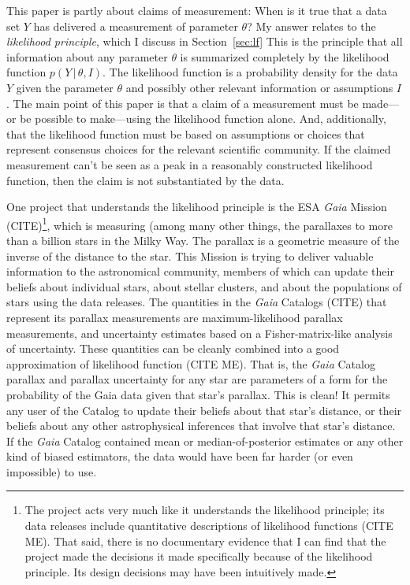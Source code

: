 \documentclass{article}
\newcommand{\sectionname}{Section}
\newcommand{\secref}[1]{\sectionname~\ref{#1}}
\newcommand{\given}{\,|\,}
\begin{document}
This paper is partly about claims of measurement:
When is it true that a data set $Y$ has delivered a measurement of parameter $\theta$?
My answer relates to the \emph{likelihood principle}, which I discuss in \secref{sec:lf}
This is the principle that all information about any parameter $\theta$ is summarized completely by the likelihood function $p(Y\given\theta, I)$.
The likelihood function is a probability density for the data $Y$ given the parameter $\theta$ and possibly other relevant information or assumptions $I$.
The main point of this paper is that a claim of a measurement must be made---or be possible to make---using the likelihood function alone.
And, additionally, that the likelihood function must be based on assumptions or choices that represent consensus choices for the relevant scientific community.
If the claimed measurement can't be seen as a peak in a reasonably constructed likelihood function, then the claim is not substantiated by the data.

One project that understands the likelihood principle is the ESA \textsl{Gaia} Mission (CITE)\footnote{%
The project acts very much like it understands the likelihood principle; its data releases include quantitative descriptions of likelihood functions (CITE ME).
That said, there is no documentary evidence that I can find that the project made the decisions it made specifically because of the likelihood principle.
Its design decisions may have been intuitively made.},
which is measuring (among many other things, the parallaxes to more than a billion stars in the Milky Way.
The parallax is a geometric measure of the inverse of the distance to the star.
This Mission is trying to deliver valuable information to the astronomical community, members of which can update their beliefs about individual stars, about stellar clusters, and about the populations of stars using the data releases.
The quantities in the \textsl{Gaia} Catalogs (CITE) that represent its parallax measurements are maximum-likelihood parallax measurements, and uncertainty estimates based on a Fisher-matrix-like analysis of uncertainty.
These quantities can be cleanly combined into a good approximation of likelihood function (CITE ME).
That is, the \textsl{Gaia} Catalog parallax and parallax uncertainty for any star are parameters of a form for the probability of the Gaia data given that star's parallax.
This is clean!
It permits any user of the Catalog to update their beliefs about that star's distance, or their beliefs about any other astrophysical inferences that involve that star's distance.
If the \textsl{Gaia} Catalog contained mean or median-of-posterior estimates or any other kind of biased estimators, the data would have been far harder (or even impossible) to use.
\end{document}
